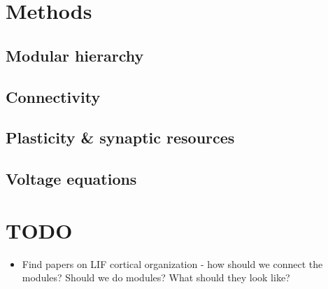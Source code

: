 \documentclass[a4paper, 12pt]{article}
\begin{document}
\section*{Methods}

\subsection*{Modular hierarchy}
\subsection*{Connectivity}
\subsection*{Plasticity & synaptic resources}
\subsection*{Voltage equations}

\section*{TODO}
\begin{itemize}
\item Find papers on LIF cortical organization - how should we connect the modules? Should we do modules? What should they look like?
\end{itemize}

\cite{lippert}



\end{document}
